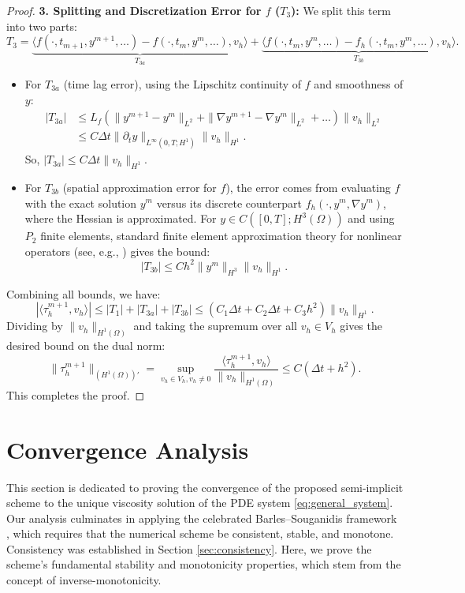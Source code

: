 \documentclass[pdflatex,sn-mathphys-num]{sn-jnl}%
\theoremstyle{thmstyleone}%
\numberwithin{equation}{section}
\begin{document}
\begin{proof}
\textbf{3. Splitting and Discretization Error for $f$ ($T_3$):}
We split this term into two parts:
\[T_3 = \underbrace{\langle f(\cdot, t_{m+1}, y^{m+1}, \dots) - f(\cdot, t_m, y^m, \dots), v_h \rangle}_{T_{3a}} + \underbrace{\langle f(\cdot, t_m, y^m, \dots) - f_h(\cdot, t_m, y^m, \dots), v_h \rangle}_{T_{3b}}. \]
\begin{itemize}
    \item For $T_{3a}$ (time lag error), using the Lipschitz continuity of $f$ and smoothness of $y$:
    \begin{align*}
    |T_{3a}| &\leq L_f \left( \|y^{m+1} - y^m\|_{L^2} + \|\nabla y^{m+1} - \nabla y^m\|_{L^2} + \dots \right) \|v_h\|_{L^2} \\
    &\leq C \Delta t \|\partial_t y\|_{L^\infty(0,T;H^1)} \|v_h\|_{H^1}.
    \end{align*}
    So, $|T_{3a}| \leq C \Delta t \|v_h\|_{H^1}$.
    
    \item For $T_{3b}$ (spatial approximation error for $f$), the error comes from evaluating $f$ with the exact solution $y^m$ versus its discrete counterpart $f_h(\cdot, y^m, \nabla y^m)$, where the Hessian is approximated. For $y \in C([0,T]; H^3(\Omega))$ and using $P_2$ finite elements, standard finite element approximation theory for nonlinear operators (see, e.g., \cite{brenner2008mathematical}) gives the bound:
    $$ |T_{3b}| \leq C h^2 \|y^m\|_{H^3} \|v_h\|_{H^1}. $$
\end{itemize}

Combining all bounds, we have:
$$|\langle \tau_h^{m+1}, v_h \rangle| \leq |T_1| + |T_{3a}| + |T_{3b}| \leq (C_1 \Delta t + C_2 \Delta t + C_3 h^2) \|v_h\|_{H^1}.$$
Dividing by $\|v_h\|_{H^1(\Omega)}$ and taking the supremum over all $v_h \in V_h$ gives the desired bound on the dual norm:
$$\|\tau_h^{m+1}\|_{(H^1(\Omega))'} = \sup_{v_h \in V_h, v_h \ne 0} \frac{\langle \tau_h^{m+1}, v_h \rangle}{\|v_h\|_{H^1(\Omega)}} \leq C(\Delta t + h^2).$$
This completes the proof.
\end{proof}




\section{Convergence Analysis}
\label{sec:analysis}

This section is dedicated to proving the convergence of the proposed semi-implicit scheme to the unique viscosity solution of the PDE system \eqref{eq:general_system}. Our analysis culminates in applying the celebrated Barles--Souganidis framework \cite{barles1991convergence}, which requires that the numerical scheme be consistent, stable, and monotone. Consistency was established in Section \ref{sec:consistency}. Here, we prove the scheme's fundamental stability and monotonicity properties, which stem from the concept of inverse-monotonicity.
\end{document}
